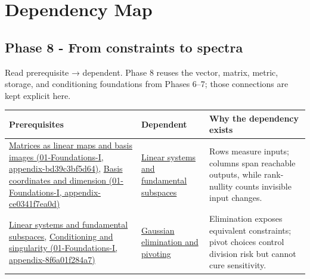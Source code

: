 \hypertarget{appendix-4ad47bdd269a}{}
\section{Dependency Map}\label{appendix-4ad47bdd269a-dependency-map}

\subsection{Phase 8 - From constraints to spectra}\label{appendix-4ad47bdd269a-phase-8---from-constraints-to-spectra}

Read prerequisite → dependent. Phase 8 reuses the vector, matrix, metric, storage, and conditioning foundations from Phases 6--7; those connections are kept explicit here.

{\def\LTcaptype{none} %
\begin{longtable}[]{@{}
  >{\raggedright\arraybackslash}p{}
  >{\raggedright\arraybackslash}p{}
  >{\raggedright\arraybackslash}p{}@{}}
\toprule\noalign{}
\begin{minipage}[b]{\linewidth}\raggedright
Prerequisites
\end{minipage} & \begin{minipage}[b]{\linewidth}\raggedright
Dependent
\end{minipage} & \begin{minipage}[b]{\linewidth}\raggedright
Why the dependency exists
\end{minipage} \\
\midrule\noalign{}
\endhead
\bottomrule\noalign{}
\endlastfoot
\href{../01-Foundations-I/main.pdf\#nameddest=appendix-bd39c3bf5d64}{Matrices as linear maps and basis images (01-Foundations-I, appendix-bd39c3bf5d64)}, \href{../01-Foundations-I/main.pdf\#nameddest=appendix-ce0341f7ea0d}{Basis coordinates and dimension (01-Foundations-I, appendix-ce0341f7ea0d)} & \hyperref[appendix-8572a4a060c1]{Linear systems and fundamental subspaces} & Rows measure inputs; columns span reachable outputs, while rank-nullity counts invisible input changes. \\
\hyperref[appendix-8572a4a060c1]{Linear systems and fundamental subspaces}, \href{../01-Foundations-I/main.pdf\#nameddest=appendix-8f6a01f284a7}{Conditioning and singularity (01-Foundations-I, appendix-8f6a01f284a7)} & \hyperref[appendix-f6e77f4a200f]{Gaussian elimination and pivoting} & Elimination exposes equivalent constraints; pivot choices control division risk but cannot cure sensitivity. \\

\end{longtable}}

